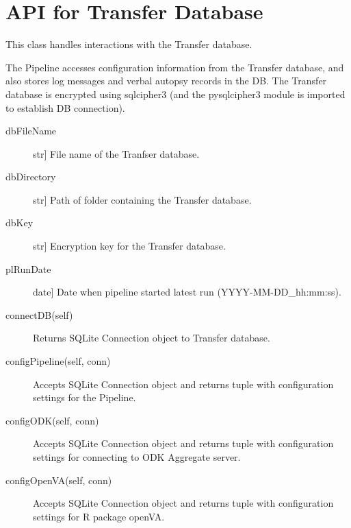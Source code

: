 \documentclass[letterpaper,12pt,english]{sphinxmanual}
\begin{document}
\section{API for Transfer Database}
\label{\detokenize{help:api-for-transfer-database}}

\begin{fulllineitems}
\label{\detokenize{help:transferDB.TransferDB}}
This class handles interactions with the Transfer database.

The Pipeline accesses configuration information from the Transfer database,
and also stores log messages and verbal autopsy records in the DB.  The
Transfer database is encrypted using sqlcipher3 (and the pysqlcipher3
module is imported to establish DB connection).
\begin{description}
\item[{dbFileName}] \leavevmode{[}str{]}
File name of the Tranfser database.

\item[{dbDirectory}] \leavevmode{[}str{]}
Path of folder containing the Transfer database.

\item[{dbKey}] \leavevmode{[}str{]}
Encryption key for the Transfer database.

\item[{plRunDate}] \leavevmode{[}date{]}
Date when pipeline started latest run (YYYY-MM-DD\_hh:mm:ss).

\end{description}
\begin{description}
\item[{connectDB(self)}] \leavevmode
Returns SQLite Connection object to Transfer database.

\item[{configPipeline(self, conn)}] \leavevmode
Accepts SQLite Connection object and returns tuple with configuration
settings for the Pipeline.

\item[{configODK(self, conn)}] \leavevmode
Accepts SQLite Connection object and returns tuple with configuration
settings for connecting to ODK Aggregate server.

\item[{configOpenVA(self, conn)}] \leavevmode
Accepts SQLite Connection object and returns tuple with configuration
settings for R package openVA.


\end{description}
\end{fulllineitems}
\end{document}
